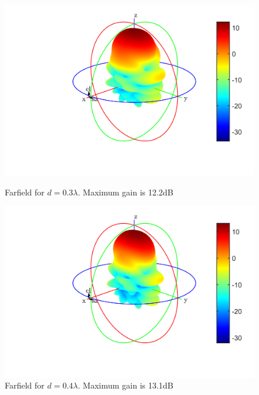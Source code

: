 \begin{figure}[H]
  \centering
  \begin{minipage}[b]{0.5\textwidth}
	\includegraphics[scale = 0.5]{figures/measurement/antennas/array_4_0p3.png}
	\caption{Farfield for $d = 0.3\lambda$. Maximum gain is 12.2dB}
    \label{fig:chamber_four_ant_ff_03}
  \end{minipage}
  \hfill
  \begin{minipage}[b]{0.4\textwidth}
\includegraphics[scale = 0.5]{figures/measurement/antennas/array_4_0p4.png}
\caption{Farfield for $d = 0.4\lambda$. Maximum gain is 13.1dB}
    \label{fig:chamber_four_ant_ff:04}
  \end{minipage}
\end{figure}

